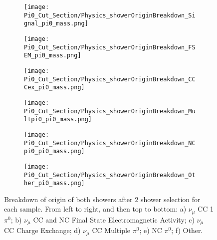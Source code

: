 \begin{figure}[H]
\centering
  \begin{subfigure}[t]{0.25\textwidth}
    \centering
\texttt{[image: Pi0\_Cut\_Section/Physics\_showerOriginBreakdown\_Signal\_pi0\_mass.png]}
  \caption{ }
  \end{subfigure} 
  \hspace{5mm}
  \begin{subfigure}[t]{0.25\textwidth}
    \centering
\texttt{[image: Pi0\_Cut\_Section/Physics\_showerOriginBreakdown\_FSEM\_pi0\_mass.png]}
  \caption{ }
  \end{subfigure} 
  \hspace{5mm}
  \begin{subfigure}[t]{0.25\textwidth}
    \centering
\texttt{[image: Pi0\_Cut\_Section/Physics\_showerOriginBreakdown\_CCCex\_pi0\_mass.png]}
  \caption{ }
  \end{subfigure} 
  \hspace{5mm}
  \begin{subfigure}[t]{0.25\textwidth}
    \centering
\texttt{[image: Pi0\_Cut\_Section/Physics\_showerOriginBreakdown\_Multpi0\_pi0\_mass.png]}
  \caption{ }
  \end{subfigure} 
  \hspace{5mm}
  \begin{subfigure}[t]{0.25\textwidth}
    \centering
\texttt{[image: Pi0\_Cut\_Section/Physics\_showerOriginBreakdown\_NCpi0\_pi0\_mass.png]}
  \caption{ }
  \end{subfigure} 
  \hspace{5mm}
  \begin{subfigure}[t]{0.25\textwidth}
    \centering
\texttt{[image: Pi0\_Cut\_Section/Physics\_showerOriginBreakdown\_Other\_pi0\_mass.png]}
  \caption{ }
  \end{subfigure} 
\caption{ Breakdown of origin of both showers after 2 shower selection for each sample.  From left to right, and then top to bottom: a) $\nu_{\mu}$ CC 1 $\pi^0$; b) $\nu_\mu$ CC and NC Final State Electromagnetic Activity; c) $\nu_{\mu}$ CC Charge Exchange; d) $\nu_\mu$ CC Multiple $\pi^0$; e) NC $\pi^0$; f) Other.  }

\label{fig:physics_showerOriginBreakdown_mass}
\end{figure}



